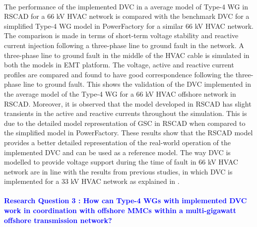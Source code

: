\paragraph{} The performance of the implemented \gls{DVC} in a average model of Type-4 \gls{WG} in RSCAD for a 66 kV \gls{HVAC} network is compared with the benchmark \gls{DVC} for a simplified Type-4 \gls{WG} model in PowerFactory for a similar 66 kV \gls{HVAC} network. The comparison is made in terms of short-term voltage stability and reactive current injection following a three-phase line to ground fault in the network. A three-phase line to ground fault in the middle of the \gls{HVAC} cable is simulated in both the models in \gls{EMT} platform. The voltage, active and reactive current profiles are compared and found to have good correspondence following the three-phase line to ground fault. This shows the validation of the \gls{DVC} implemented in the average model of the Type-4 \gls{WG} for a 66 kV \gls{HVAC} offshore network in RSCAD. Moreover, it is observed that the model developed in RSCAD has slight transients in the active and reactive currents throughout the simulation. This is due to the detailed model representation of \gls{GSC} in RSCAD when compared to the simplified model in PowerFactory. These results show that the RSCAD model provides a better detailed representation of the real-world operation of the implemented \gls{DVC} and can be used as a reference model. The way \gls{DVC} is modelled to provide voltage support during the time of fault in 66 kV \gls{HVAC} network are in line with the results from previous studies, in which \gls{DVC} is implemented for a 33 kV \gls{HVAC} network as explained in \cite{korai_dynamic_2019}.   




\paragraph{\textcolor{blue}{Research Question 3 : How can Type-4 \gls{WG}s with implemented \gls{DVC} work in coordination with offshore \gls{MMC}s within a multi-gigawatt offshore transmission network?}}

